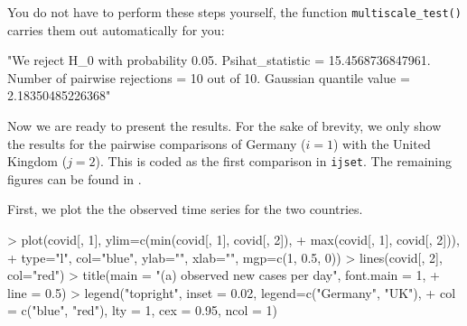 \documentclass[a4paper]{scrartcl}
\begin{document}
You do not have to perform these steps yourself, the function \verb|multiscale_test()| carries them out automatically for you:

\begin{Schunk}
\begin{Soutput}
[1] "We reject H_0 with probability 0.05. Psihat_statistic = 15.4568736847961. Number of pairwise rejections = 10 out of 10. Gaussian quantile value = 2.18350485226368"
\end{Soutput}
\end{Schunk}

Now we are ready to present the results. For the sake of brevity, we only show the results for the pairwise comparisons of Germany ($i = 1$) with the United Kingdom ($j = 2$). This is coded as the first comparison in \verb|ijset|. The remaining figures can be found in \cite{KhismatullinaVogt2023}.

First, we plot the the observed time series for the two countries.

\begin{Schunk}
\begin{Sinput}
> plot(covid[, 1], ylim=c(min(covid[, 1], covid[, 2]),
+                         max(covid[, 1], covid[, 2])),
+      type="l", col="blue", ylab="", xlab="", mgp=c(1, 0.5, 0))
> lines(covid[, 2], col="red")
> title(main = "(a) observed new cases per day", font.main = 1,
+       line = 0.5)
> legend("topright", inset = 0.02, legend=c("Germany", "UK"),
+        col = c("blue", "red"), lty = 1, cex = 0.95, ncol = 1)
\end{Sinput}
\end{Schunk}
\end{document}
